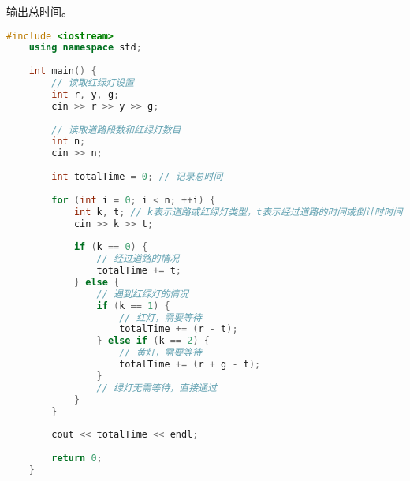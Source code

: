 输出总时间。

\begin{lstlisting}[language=C++]
    #include <iostream>
    using namespace std;
    
    int main() {
        // 读取红绿灯设置
        int r, y, g;
        cin >> r >> y >> g;
    
        // 读取道路段数和红绿灯数目
        int n;
        cin >> n;
    
        int totalTime = 0; // 记录总时间
    
        for (int i = 0; i < n; ++i) {
            int k, t; // k表示道路或红绿灯类型，t表示经过道路的时间或倒计时时间
            cin >> k >> t;
    
            if (k == 0) {
                // 经过道路的情况
                totalTime += t;
            } else {
                // 遇到红绿灯的情况
                if (k == 1) {
                    // 红灯，需要等待
                    totalTime += (r - t);
                } else if (k == 2) {
                    // 黄灯，需要等待
                    totalTime += (r + g - t);
                }
                // 绿灯无需等待，直接通过
            }
        }
    
        cout << totalTime << endl;
    
        return 0;
    }
    
\end{lstlisting}